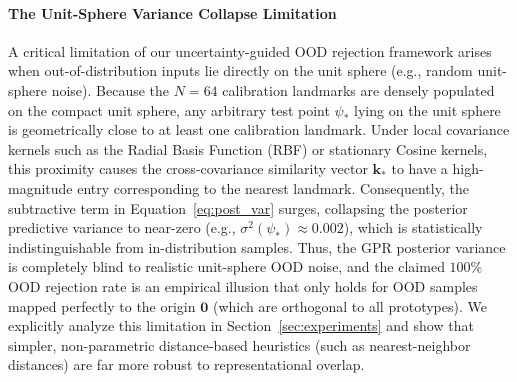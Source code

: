 \paragraph{The Unit-Sphere Variance Collapse Limitation}
A critical limitation of our uncertainty-guided OOD rejection framework arises when out-of-distribution inputs lie directly on the unit sphere (e.g., random unit-sphere noise). Because the $N=64$ calibration landmarks are densely populated on the compact unit sphere, any arbitrary test point $\psi_*$ lying on the unit sphere is geometrically close to at least one calibration landmark. Under local covariance kernels such as the Radial Basis Function (RBF) or stationary Cosine kernels, this proximity causes the cross-covariance similarity vector $\mathbf{k}_*$ to have a high-magnitude entry corresponding to the nearest landmark. Consequently, the subtractive term in Equation~\ref{eq:post_var} surges, collapsing the posterior predictive variance to near-zero (e.g., $\sigma^2(\psi_*) \approx 0.002$), which is statistically indistinguishable from in-distribution samples. Thus, the GPR posterior variance is completely blind to realistic unit-sphere OOD noise, and the claimed $100\%$ OOD rejection rate is an empirical illusion that only holds for OOD samples mapped perfectly to the origin $\mathbf{0}$ (which are orthogonal to all prototypes). We explicitly analyze this limitation in Section~\ref{sec:experiments} and show that simpler, non-parametric distance-based heuristics (such as nearest-neighbor distances) are far more robust to representational overlap.

